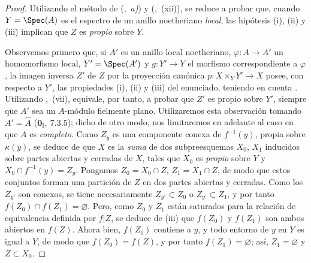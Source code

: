 \begin{proof}
Utilizando el método de (,~\emph{a)}) y (,~(xii)), se reduce a probar que, cuando $Y=\Spec(A)$ es el espectro de un anillo noetheriano \emph{local}, las hipótesis (i), (ii) y (iii) implican que $Z$ es \emph{propio} sobre $Y$.

Observemos primero que, si $A'$ es un anillo local noetheriano, $\varphi:A\to A'$ un homomorfismo local, $Y'=\Spec(A')$ y $g:Y'\to Y$ el morfismo correspondiente a $\varphi$, la imagen inversa $Z'$ de $Z$ por la proyección canónica $p:X\times_Y Y'\to X$ posee, con respecto a $Y'$, las propiedades (i), (ii) y (iii) del enunciado, teniendo en cuenta . Utilizando ,~(vii), equivale, por tanto, a probar que $Z'$ es propio sobre $Y'$, siempre que $A'$ sea un $A$-módulo fielmente plano.
Utilizaremos esta observación tomando $A'=\hat{A}$ ($\mathbf{0}_{\mathrm{I}},~7.3.5$); dicho de otro modo, nos limitaremos en adelante al caso en que $A$ es \emph{completo}.
Como $Z_y$ es una componente conexa de $f^{-1}(y)$, propia sobre $\kappa(y)$, se deduce de  que $X$ es la \emph{suma} de dos subpreesquemas $X_0$, $X_1$ inducidos sobre partes abiertas y cerradas de $X$, tales que $X_0$ es \emph{propio} sobre $Y$ y $X_0\cap f^{-1}(y)=Z_y$.
Pongamos $Z_0=X_0\cap Z$, $Z_1=X_1\cap Z$, de modo que estos conjuntos forman una partición de $Z$ en dos partes abiertas y cerradas.
Como los $Z_{y'}$ son conexos, se tiene necesariamente $Z_{y'}\subset Z_0$ o $Z_{y'}\subset Z_1$, y por tanto $f(Z_0)\cap f(Z_1)=\varnothing$.
Pero, como $Z_0$ y $Z_1$ están saturados para la relación de equivalencia definida por $f|Z$, se deduce de (iii) que $f(Z_0)$ y $f(Z_1)$ son ambos abiertos en $f(Z)$.
Ahora bien, $f(Z_0)$ contiene a $y$, y todo entorno de $y$ en $Y$ es igual a $Y$, de modo que $f(Z_0)=f(Z)$, y por tanto $f(Z_1)=\varnothing$; así, $Z_1=\varnothing$ y $Z\subset X_0$.


\end{proof}

